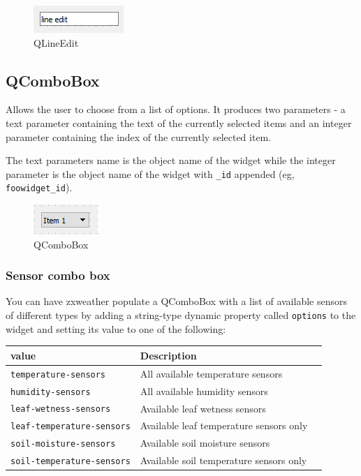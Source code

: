 \documentclass[a4paper,10pt]{book}
\begin{document}
\begin {figure}[!ht]
 \centering
 \includegraphics[scale=1.0]{images/widget/qlineedit}
 \caption{QLineEdit}
\end {figure}

\subsection{QComboBox}
Allows the user to choose from a list of options. It produces two parameters - a text parameter containing the text of the currently selected items and an integer parameter containing the index of the currently selected item.

The text parameters name is the object name of the widget while the integer parameter is the object name of the widget with \verb|_id| appended (eg, \verb|foowidget_id|).

\begin {figure}[!ht]
 \centering
 \includegraphics[scale=1.0]{images/widget/qcombobox}
 \caption{QComboBox}
\end {figure}

\subsubsection{Sensor combo box}
You can have zxweather populate a QComboBox with a list of available sensors of different types by adding a string-type dynamic property called \verb|options| to the widget and setting its value to one of the following:

\begin{tabular}{p{5cm} p{8cm} l}
\hline
\textbf{value} & \textbf{Description} \\
\hline
\verb|temperature-sensors| & All available temperature sensors \\
\verb|humidity-sensors| & All available humidity sensors \\
\verb|leaf-wetness-sensors| & Available leaf wetness sensors \\
\verb|leaf-temperature-sensors| & Available leaf temperature sensors only\\
\verb|soil-moisture-sensors| & Available soil moisture sensors\\
\verb|soil-temperature-sensors| & Available soil temperature sensors only\\
\hline
\end{tabular}
\end{document}
